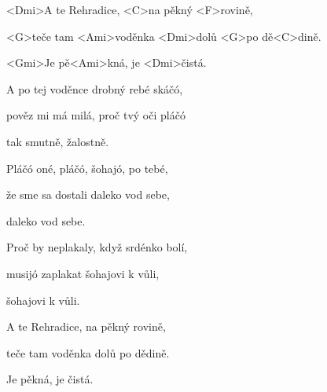 

\zs
<Dmi>A te Rehradice, <C>na pěkný <F>rovině,

<G>teče tam <Ami>voděnka <Dmi>dolů <G>po dě<C>dině.

<Gmi>Je pě<Ami>kná, je <Dmi>čistá.
\ks

\zs
A po tej voděnce drobný rebé skáčó,

pověz mi má milá, proč tvý oči pláčó

tak smutně, žalostně.
\ks

\zs
Pláčó oné, pláčó, šohajó, po tebé,

že sme sa dostali daleko vod sebe,

daleko vod sebe.
\ks

\zs
Proč by neplakaly, když srdénko bolí,

musijó zaplakat šohajovi k vůli,

šohajovi k vůli.
\ks

\zs
A te Rehradice, na pěkný rovině,

teče tam voděnka dolů po dědině.

Je pěkná, je čistá.
\ks

\kp
